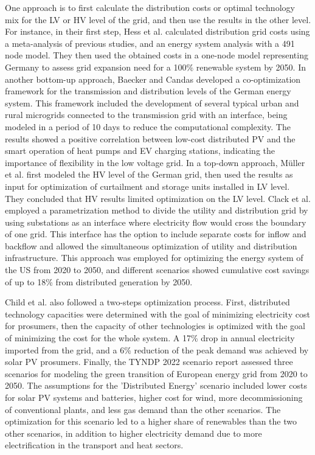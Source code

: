 \documentclass[review]{elsarticle}
\begin{document}
One approach is to first calculate the distribution costs or optimal technology mix for the LV or HV level of the grid, and then use the results in the other level. For instance, in their first step, Hess et al. \cite{hess_2018}  calculated distribution grid costs using a meta-analysis of previous studies, and an energy system analysis with a 491 node model. They then used the obtained costs in a one-node model representing Germany to assess grid expansion need for a 100\% renewable system by 2050. In another bottom-up approach, Baecker and Candas  \cite{candas_2022}   developed a co-optimization framework for the transmission and distribution levels of the German energy system. This framework included the development of several typical urban and rural microgrids connected to the transmission grid with an interface, being modeled in a period of 10 days to reduce the computational complexity. The results showed a positive correlation between low-cost distributed PV and the smart operation of heat pumps and EV charging stations, indicating the importance of flexibility in the low voltage grid. In a top-down approach, Müller et al. \cite{muller_2019}  first modeled the HV level of the German grid, then used the results as input for optimization of curtailment and storage units installed in LV level. They concluded that HV results limited optimization on the LV level. Clack et al. \cite{clack_2020}  employed a parametrization method to divide the utility and distribution grid by using substations as an interface where electricity flow would cross the boundary of one grid. This interface has the option to include separate costs for inflow and backflow and allowed the simultaneous optimization of utility and distribution infrastructure. This approach was employed for optimizing the energy system of the US from 2020 to 2050, and different scenarios showed cumulative cost savings of up to 18\% from distributed generation by 2050. 

Child et al. \cite{child_2019} also followed a two-steps optimization process. First, distributed technology capacities were determined with the goal of minimizing electricity cost for prosumers, then the capacity of other technologies is optimized with the goal of minimizing the cost for the whole system. A 17\% drop in annual electricity imported from the grid, and a 6\% reduction of the peak demand was achieved by solar PV prosumers. Finally, the TYNDP 2022 scenario report \cite{TYNDP}  assessed three scenarios for modeling the green transition of European energy grid from 2020 to 2050. The assumptions for the 'Distributed Energy' scenario included lower costs for solar PV systems and batteries, higher cost for wind, more decommissioning of conventional plants, and less gas demand than the other scenarios. The optimization for this scenario led to a higher share of renewables than the two other scenarios, in addition to higher electricity demand due to more electrification in the transport and heat sectors.
\end{document}

